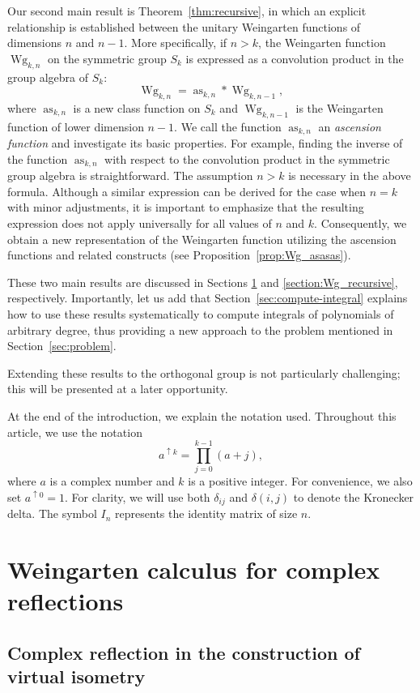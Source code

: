 \documentclass[pdftex]{sigma}
\numberwithin{equation}{section}
\theoremstyle{definition}
\DeclareMathOperator{\Raise}{as}
\DeclareMathOperator{\Wg}{Wg}
\begin{document}
Our second main result is Theorem~\ref{thm:recursive}, in which an explicit relationship is established between the unitary Weingarten functions of dimensions $n$ and $n-1$.
More specifically, if $n >k$, the Weingarten function $\Wg_{k,n}$ on the symmetric group $S_k$ is expressed as a convolution product in the group algebra of $S_k$:
\[
\Wg_{k,n}= \Raise_{k,n} * \Wg_{k,n-1},
\]
where $\Raise_{k,n}$ is a new class function on $S_k$ and $\Wg_{k,n-1}$ is the Weingarten function of lower dimension $n-1$.
We call the function $\Raise_{k,n}$ an \emph{ascension function} and investigate its basic properties.
For example, finding the inverse of the function $\Raise_{k,n}$ with respect to the convolution product in the symmetric group algebra is straightforward.
The assumption $n > k$ is necessary in the above formula. Although a similar expression can be derived for the case when $ n = k $ with minor adjustments, it is important to emphasize that the resulting expression does not apply universally for all values of $ n $ and $ k $. Consequently, we obtain a new representation of the Weingarten function utilizing the ascension functions and related constructs (see Proposition~\ref{prop:Wg_asasas}).

These two main results are discussed in Sections \ref{section:Wg_P} and \ref{section:Wg_recursive}, respectively.
Importantly, let us add that Section~\ref{sec:compute-integral} explains how to use these results systematically to compute integrals of polynomials of arbitrary degree, thus providing a new approach to the problem mentioned in Section~\ref{sec:problem}.

Extending these results to the orthogonal group is not particularly challenging; this will be presented at a later opportunity.


At the end of the introduction, we explain the notation used.
Throughout this article, we use the notation
\[
a^{\uparrow k} = \prod_{j=0}^{k-1} (a+j),
\]
where $a$ is a complex number and $k$ is a positive integer. For convenience, we also set $a^{\uparrow 0}=1$.
For clarity, we will use both $\delta_{ij}$ and $\delta(i,j)$ to denote the Kronecker delta.
The symbol $ I_n $ represents the identity matrix of size $ n $.


\section{Weingarten calculus for complex reflections} \label{section:Wg_P}

\subsection{Complex reflection in the construction of virtual isometry}
\end{document}
